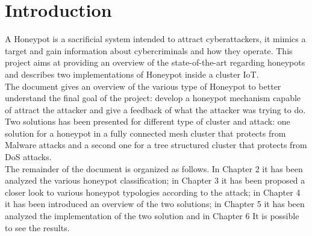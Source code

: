 \chapter{Introduction}
A Honeypot is a  sacrificial system intended to attract cyberattackers, it mimics a target and gain information about cybercriminals and how they operate.
This project aims at providing an overview of the state-of-the-art regarding honeypots and describes two implementations of Honeypot inside a cluster IoT.\\
The document gives an overview of the various type of Honeypot to better understand the final goal of the project: develop a honeypot mechanism capable of attract the attacker and give a feedback of what the attacker was trying to do.\\
Two solutions has been presented for different type of cluster and attack: one solution for a honeypot in a fully connected mesh cluster that protects from Malware attacks and a second one for a tree structured cluster that protects from DoS attacks. \\
The remainder of the document is organized as follows. In Chapter 2 it has been analyzed the various honeypot classification; in Chapter 3 it has been proposed a closer look to various honeypot typologies according to the attack; in Chapter 4 it  has been introduced an overview of the two solutions; in Chapter 5 it has been analyzed the implementation of the two solution and in Chapter 6 It is possible to see the results.

